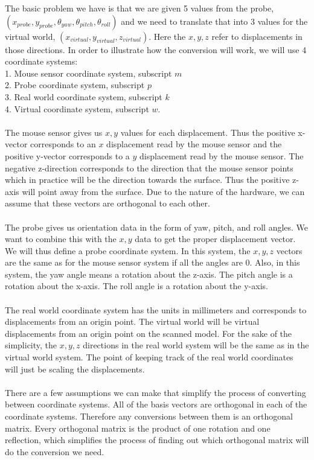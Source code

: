 \documentclass[conference]{acmsiggraph}
\begin{document}
The basic problem we have is that we are given 5 values from the probe, $(x_{probe},y_{probe},\theta_{yaw},\theta_{pitch},\theta_{roll})$ and we need to translate that into 3 values for the virtual world, $(x_{virtual},y_{virtual},z_{virtual})$. Here the $x,y,z$ refer to displacements in those directions. In order to illustrate how the conversion will work, we will use 4 coordinate systems:\\
1. Mouse sensor coordinate system, subscript $m$\\
2. Probe coordinate system,  subscript $p$\\
3. Real world coordinate system, subscript $k$\\
4. Virtual coordinate system, subscript $w$.\\
\\
The mouse sensor gives us $x,y$ values for each displacement. Thus the positive x-vector corresponds to an $x$ displacement read by the mouse sensor and the positive y-vector corresponds to a $y$ displacement read by the mouse sensor. The negative z-direction corresponds to the direction that the mouse sensor points which in practice will be the direction towards the surface. Thus the positive z-axis will point away from the surface. Due to the nature of the hardware, we can assume that these vectors are orthogonal to each other.\\
\\
The probe gives us orientation data in the form of yaw, pitch, and roll angles. We want to combine this with the $x,y$ data to get the proper displacement vector. We will thus define a probe coordinate system. In this system, the $x,y,z$ vectors are the same as for the mouse sensor system if all the angles are $0$. Also, in this system, the yaw angle means a rotation about the z-axis. The pitch angle is a rotation about the x-axis. The roll angle is a rotation about the y-axis. \\
\\
The real world coordinate system has the units in millimeters and corresponds to displacements from an origin point. The virtual world will be virtual displacements from an origin point on the scanned model. For the sake of the simplicity, the $x,y,z$ directions in the real world system will be the same as in the virtual world system. The point of keeping track of the real world coordinates will just be scaling the displacements. \\
\\
There are a few assumptions we can make that simplify the process of converting between coordinate systems. All of the basis vectors are orthogonal in each of the coordinate systems. Therefore any conversions between them is an orthogonal matrix. Every orthogonal matrix is the product of one rotation and one reflection, which simplifies the process of finding out which orthogonal matrix will do the conversion we need. \\
\end{document}
